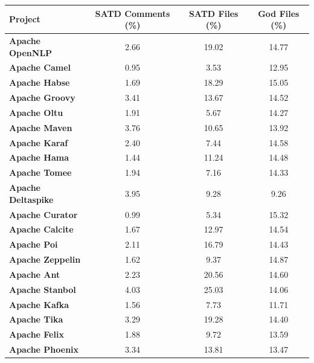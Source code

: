 \begin{landscape}
\begin{table}[htbp]
\begin{adjustbox}{width=1.0\textwidth}
			
			\begin{tabular}{l|c|c|c}
				\hline
				\textbf{Project}  & \textbf{SATD Comments (\%)}  & \textbf{SATD Files (\%)} & \textbf{God Files (\%)} \\ \hline
				\textbf{Apache OpenNLP} &  2.66 & 19.02 & 14.77   \\ \hline
				\textbf{Apache Camel} &  0.95 & 3.53 & 12.95    \\ \hline
				\textbf{Apache Habse} & 1.69 &  18.29 & 15.05    \\ \hline
				\textbf{Apache Groovy} &  3.41 & 13.67 & 14.52    \\ \hline
				\textbf{Apache Oltu} &  1.91 & 5.67 & 14.27    \\ \hline
				\textbf{Apache Maven} &  3.76 & 10.65 & 13.92    \\ \hline
				\textbf{Apache Karaf} &  2.40 & 7.44 & 14.58   \\ \hline
				\textbf{Apache Hama} &  1.44 & 11.24 & 14.48    \\ \hline
				\textbf{Apache Tomee} &  1.94 & 7.16 & 14.33   \\ \hline
				\textbf{Apache Deltaspike} &  3.95 & 9.28 & 9.26    \\ \hline
				\textbf{Apache Curator} &  0.99 & 5.34 & 15.32    \\ \hline
				\textbf{Apache Calcite} &  1.67 & 12.97 & 14.54    \\ \hline
				\textbf{Apache Poi} &  2.11 & 16.79 & 14.43    \\ \hline
				\textbf{Apache Zeppelin} &  1.62 & 9.37 & 14.87    \\ \hline
				\textbf{Apache Ant} &  2.23 & 20.56 & 14.60   \\ \hline
				\textbf{Apache Stanbol} &  4.03 & 25.03 & 14.06   \\ \hline
				\textbf{Apache Kafka} &  1.56 & 7.73 & 11.71    \\ \hline
				\textbf{Apache Tika} &  3.29 & 19.28 & 14.40    \\ \hline
				\textbf{Apache Felix} & 1.88 & 9.72 & 13.59   \\ \hline
				\textbf{Apache Phoenix} &  3.34 & 13.81 & 13.47    \\ \hline
				
			\end{tabular}
			\label{table:projects_satd_god_percentage}
			
		\end{adjustbox}
		
	\end{table}
	
\end{landscape}



